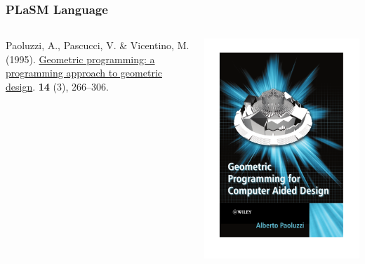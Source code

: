 \documentclass[ignorenonframetext,]{beamer}
\begin{document}
\begin{frame}\frametitle{PLaSM Language}

\begin{columns}
\begin{column}{5cm}

\begin{thebibliography}{}

Paoluzzi, A., Pascucci, V.  \& Vicentino, M. (1995{\em{}}).
\newblock \href{http://dl.acm.org/citation.cfm?id=212349}{Geometric programming: a programming approach to geometric design}.
 {\bf 14} (3), 266--306.

\end{thebibliography}

\end{column}
\begin{column}{5cm}
   \centering
   \href{http://onlinelibrary.wiley.com/book/10.1002/0470013885}{\includegraphics[width=0.8\linewidth]{Paoluzzi}}
\end{column}
\end{columns}

\end{frame}
\end{document}
